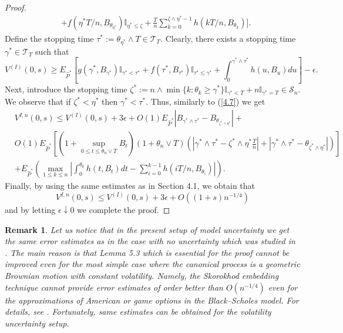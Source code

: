 \documentclass{amsart}
\newtheorem{rem}[thm]{Remark}
\numberwithin{equation}{section}
\begin{document}
\begin{proof}
\begin{eqnarray}
&+f(\eta^* T/n,B_{\theta_{\eta^*}})\mathbb{I}_{\eta^*\leq\zeta}+\frac{T}{n}\sum_{k=0}^{\zeta\wedge\eta^*-1} h(kT/n,B_{\theta_k})].\nonumber
\end{eqnarray}
Define the stopping time $\tau^*:=\theta_{\eta^*}\wedge T\in\mathcal T_T$. Clearly, there exists a stopping time $\gamma^{*}\in\mathcal T_T$ such that
\begin{equation*}\label{4.12}
V^{(I)}(0,s)\geq E_{\hat P^*}\left[g(\gamma^*,B_{\gamma^*}){\mathbb I}_{\gamma^*<\tau^*}+
f(\tau^*,B_{\tau^*})\mathbb{I}_{\tau^*\leq\gamma^*}+\int_{0}^{\gamma^*\wedge\tau^*}h(u, B_{u})du\right]-\epsilon.
\end{equation*}
Next, introduce the stopping time
$\zeta^*:=n\wedge\min\{k:\theta_k\geq\gamma^*\}\mathbb{I}_{\gamma^*<T}+n\mathbb{I}_{\gamma^*=T}\in\mathcal S_n$. We observe that
if $\zeta^*<\eta^*$ then $\gamma^*<\tau^*$. Thus, similarly to (\ref{4.7}) we get
\begin{eqnarray*}
&V^{I,n}(0,s)\leq V^{(I)}(0,s)+3\epsilon+O(1)E_{\hat P^*}|B_{\gamma^*\wedge\tau^*}-B_{\theta_{\zeta^*\wedge\eta^*}}|+\\
& O(1) E_{\hat P^*}\left[(1+\sup_{0\leq t\leq\theta_n\vee T} B_t)(1+\theta_n\vee T)(|\gamma^*\wedge\tau^*-\zeta^*\wedge\eta^*\frac{T}{n}|+|\gamma^*\wedge\tau^*-\theta_{\zeta^*\wedge\eta^*}|)\right]\nonumber\\
&+E_{\hat P^*}\left(\max_{1\leq k\leq n}\left|\int_{0}^{\theta_k} h(t,B_t)dt-\sum_{i=0}^{k-1} h(i T/n, B_{\theta_i})\right|\right).\nonumber
\end{eqnarray*}
Finally, by using the same estimates as in Section 4.1, we obtain
that
$$V^{I,n}(0,s)\leq V^{(I)}(0,s)+3\epsilon+O((1+s) n^{-1/4})$$
and by letting $\epsilon\downarrow 0$ we complete the proof.
\end{proof}
\begin{rem}
Let us notice that in the present setup of model uncertainty we get the same error estimates as in the case
with no uncertainty which was studied in \cite{BDG}. The main reason is that Lemma 5.3 which is essential for the proof
cannot be improved even for the most simple case where the canonical process
is a geometric Brownian motion with constant volatility. Namely, the Skorokhod embedding technique cannot provide error estimates of order better than
$O(n^{-1/4})$ even for the approximations of American or game options in the Black--Scholes model.
For details, see \cite{Ki1}.
Fortunately, same estimates can be obtained for the volatility
uncertainty setup.
\end{rem}
\end{document}

